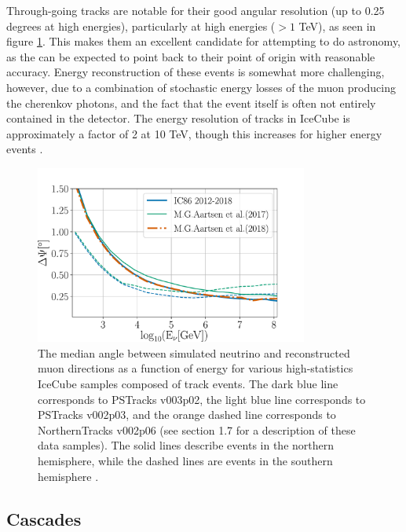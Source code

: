 Through-going tracks are notable for their good angular resolution (up to 0.25 degrees at high energies), particularly at high energies ($> 1$ TeV), as seen in figure \ref{fig:angres}. This makes them an excellent candidate for attempting to do astronomy, as the can be expected to point back to their point of origin with reasonable accuracy. Energy reconstruction of these events is somewhat more challenging, however, due to a combination of stochastic energy losses of the muon producing the cherenkov photons, and the fact that the event itself is often not entirely contained in the detector. The energy resolution of tracks in IceCube is approximately a factor of 2 at 10 TeV, though this increases for higher energy events \cite{10yrpublicdata}.

\begin{figure}[h]
\centering
\includegraphics[width=0.8\textwidth]{figs/angres.pdf}
\caption{The median angle between simulated neutrino and reconstructed muon directions as a function of energy for various high-statistics IceCube samples composed of track events. The dark blue line corresponds to PSTracks v003p02, the light blue line corresponds to PSTracks v002p03, and the orange dashed line corresponds to NorthernTracks v002p06 (see section 1.7 for a description of these data samples). The solid lines describe events in the northern hemisphere, while the dashed lines are events in the southern hemisphere \cite{10yr_tint}\cite{NorthernTracks_PS}\cite{7yr_tint}.}
\label{fig:angres}
\end{figure}

\subsection{Cascades}

